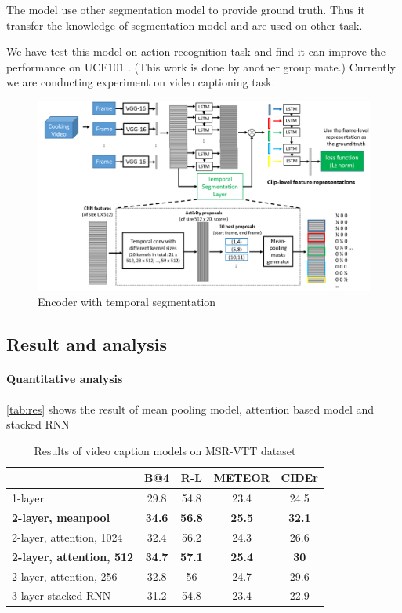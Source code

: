 The model use other segmentation model to provide ground truth. Thus it transfer the knowledge of segmentation model and are used on other task.

We have test this model on action recognition task and find it can improve the performance on UCF101 \cite{Soomro2012UCF101}. (This work is done by another group mate.) Currently we are conducting experiment on video captioning task.

\begin{figure}[htbp]
\centering
\includegraphics[width=15cm]{resources/ts2.png}
\caption{Encoder with temporal segmentation}
\label{fig:ts2}
\end{figure}

\subsection{Result and analysis}
\paragraph{Quantitative analysis}
\autoref{tab:res} shows the result of mean pooling model, attention based model and stacked RNN
\begin{table}[htbp]
  \centering
  \caption{Results of video caption models on MSR-VTT dataset}
    \begin{tabular}{lcccc}
    \toprule
          & \textbf{B@4\cite{Papineni2015BLEU}} & \textbf{R-L\cite{Lin2004Automatic}} & \textbf{METEOR\cite{Lavie2007METEOR}} & \textbf{CIDEr\cite{Vedantam2015CIDEr}} \\
    \midrule
    1-layer & 29.8  & 54.8  & 23.4  & 24.5 \\
    \textbf{2-layer, meanpool} & \textbf{34.6} & \textbf{56.8} & \textbf{25.5} & \textbf{32.1} \\
    2-layer, attention, 1024 & 32.4  & 56.2  & 24.3  & 26.6 \\
    \textbf{2-layer, attention, 512} & \textbf{34.7} & \textbf{57.1} & \textbf{25.4} & \textbf{30} \\
    2-layer, attention, 256 & 32.8  & 56    & 24.7  & 29.6 \\
    3-layer stacked RNN & 31.2  & 54.8  & 23.4  & 22.9 \\
    \bottomrule
    \end{tabular}
  \label{tab:res}
\end{table}


